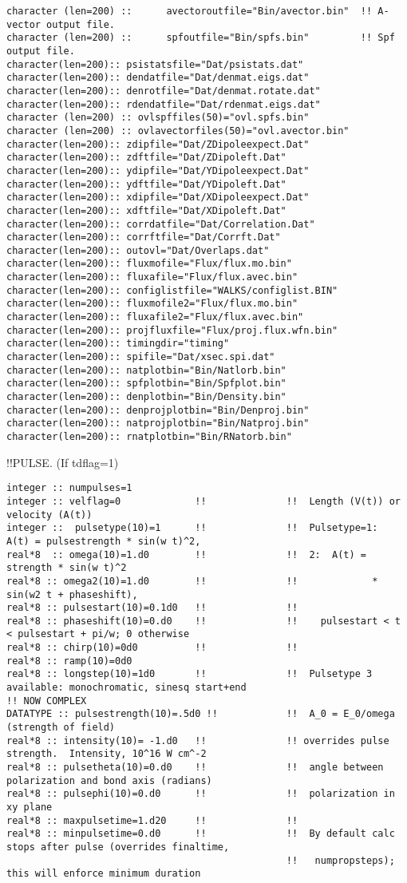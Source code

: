 \begin{verbatim}
character (len=200) ::      avectoroutfile="Bin/avector.bin"  !! A-vector output file.        
character (len=200) ::      spfoutfile="Bin/spfs.bin"         !! Spf output file.
character(len=200):: psistatsfile="Dat/psistats.dat"
character(len=200):: dendatfile="Dat/denmat.eigs.dat"
character(len=200):: denrotfile="Dat/denmat.rotate.dat"
character(len=200):: rdendatfile="Dat/rdenmat.eigs.dat"
character (len=200) :: ovlspffiles(50)="ovl.spfs.bin"
character (len=200) :: ovlavectorfiles(50)="ovl.avector.bin"
character(len=200):: zdipfile="Dat/ZDipoleexpect.Dat"
character(len=200):: zdftfile="Dat/ZDipoleft.Dat"
character(len=200):: ydipfile="Dat/YDipoleexpect.Dat"
character(len=200):: ydftfile="Dat/YDipoleft.Dat"
character(len=200):: xdipfile="Dat/XDipoleexpect.Dat"
character(len=200):: xdftfile="Dat/XDipoleft.Dat"
character(len=200):: corrdatfile="Dat/Correlation.Dat"
character(len=200):: corrftfile="Dat/Corrft.Dat"
character(len=200):: outovl="Dat/Overlaps.dat"
character(len=200):: fluxmofile="Flux/flux.mo.bin"
character(len=200):: fluxafile="Flux/flux.avec.bin"
character(len=200):: configlistfile="WALKS/configlist.BIN"
character(len=200):: fluxmofile2="Flux/flux.mo.bin"
character(len=200):: fluxafile2="Flux/flux.avec.bin"
character(len=200):: projfluxfile="Flux/proj.flux.wfn.bin"
character(len=200):: timingdir="timing"
character(len=200):: spifile="Dat/xsec.spi.dat"
character(len=200):: natplotbin="Bin/Natlorb.bin"
character(len=200):: spfplotbin="Bin/Spfplot.bin"
character(len=200):: denplotbin="Bin/Density.bin"
character(len=200):: denprojplotbin="Bin/Denproj.bin"
character(len=200):: natprojplotbin="Bin/Natproj.bin"
character(len=200):: rnatplotbin="Bin/RNatorb.bin"
\end{verbatim}
!!{\large \quad PULSE.  (If tdflag=1) }
\begin{verbatim}
integer :: numpulses=1
integer :: velflag=0             !!              !!  Length (V(t)) or velocity (A(t))       
integer ::  pulsetype(10)=1      !!              !!  Pulsetype=1:  A(t) = pulsestrength * sin(w t)^2,
real*8  :: omega(10)=1.d0        !!              !!  2:  A(t) = strength * sin(w t)^2 
real*8 :: omega2(10)=1.d0        !!              !!             * sin(w2 t + phaseshift),
real*8 :: pulsestart(10)=0.1d0   !!              !!   
real*8 :: phaseshift(10)=0.d0    !!              !!    pulsestart < t < pulsestart + pi/w; 0 otherwise
real*8 :: chirp(10)=0d0          !!              !!
real*8 :: ramp(10)=0d0
real*8 :: longstep(10)=1d0       !!              !!  Pulsetype 3 available: monochromatic, sinesq start+end
!! NOW COMPLEX
DATATYPE :: pulsestrength(10)=.5d0 !!            !!  A_0 = E_0/omega (strength of field)  
real*8 :: intensity(10)= -1.d0   !!              !! overrides pulse strength.  Intensity, 10^16 W cm^-2 
real*8 :: pulsetheta(10)=0.d0    !!              !!  angle between polarization and bond axis (radians)
real*8 :: pulsephi(10)=0.d0      !!              !!  polarization in xy plane
real*8 :: maxpulsetime=1.d20     !!              !!  
real*8 :: minpulsetime=0.d0      !!              !!  By default calc stops after pulse (overrides finaltime,
                                                 !!   numpropsteps); this will enforce minimum duration
\end{verbatim} 
